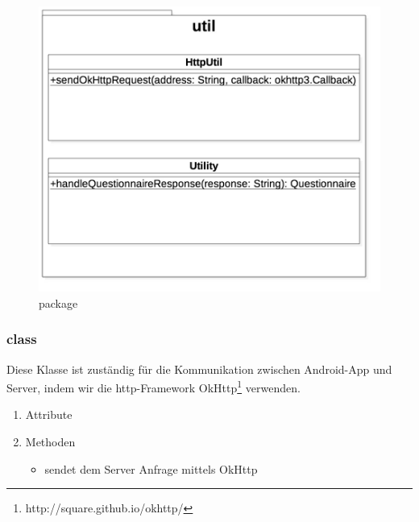 \documentclass[a4paper]{scrreprt}
\begin{document}
{                \vspace*{3cm}
                \begin{figure}[H]
                    \centering
                    \includegraphics[scale = 0.5]{util.jpg}
                    \caption{package }
                \end{figure}

                \subsubsection{class }

                    Diese Klasse ist zuständig für die Kommunikation zwischen Android-App und Server, indem wir die http-Framework OkHttp\footnote{http://square.github.io/okhttp/} verwenden.

                    \begin{enumerate}
                        \item Attribute
                        \item Methoden
                            \begin{itemize}
                                \item {\large {}}
                                    sendet dem Server Anfrage mittels OkHttp
                            \end{itemize}
                    \end{enumerate}

}
\end{document}
